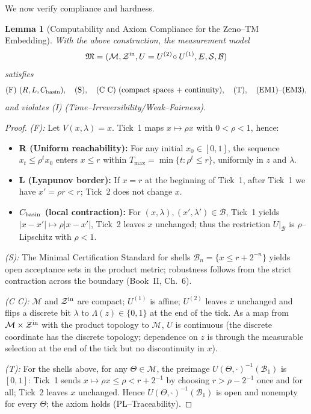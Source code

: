 \documentclass[12pt]{article}
\theoremstyle{definition}
\theoremstyle{plain}
\newtheorem{lemma}{Lemma}[section]
\begin{document}
\medskip
We now verify compliance and hardness.

\begin{lemma}[Computability and Axiom Compliance for the Zeno–TM Embedding]
\label{lem:zeno‐computability}
With the above construction, the measurement model 
\[
\mathfrak M=(\mathcal M,\mathcal Z^{\rm in},U=U^{(2)}\!\circ U^{(1)},E,\mathcal S,\mathcal B)
\]
satisfies
\[
\textup{(F)}\ (\textup{$R,L,C_{\rm basin}$}),\quad
\textup{(S)},\quad
\textup{(C C)}\ (\text{compact spaces + continuity}),\quad
\textup{(T)},\quad
\textup{(EM1)--(EM3)},
\]
and \emph{violates} \textup{(I)} (Time–Irreversibility/Weak–Fairness).
\end{lemma}

\begin{proof}
\emph{(F):} Let $V(x,\lambda)=x$. 
Tick~1 maps $x\mapsto \rho x$ with $0<\rho<1$, hence:
\begin{itemize}
  \item \textbf{R (Uniform reachability):} For any initial $x_0\in[0,1]$, the sequence $x_t\le\rho^t x_0$ enters $x\le r$ within
  \(
  T_{\max}
  = \min\{t: \rho^t \le r\}
  \),
  uniformly in $z$ and $\lambda$.
  \item \textbf{L (Lyapunov border):} If $x=r$ at the beginning of Tick~1, after Tick~1 we have $x'=\rho r<r$; Tick~2 does not change $x$.
  \item \textbf{$C_{\rm basin}$ (local contraction):} For $(x,\lambda),(x',\lambda')\in \mathcal B$,
  Tick~1 yields $|x-x'|\mapsto \rho |x-x'|$, Tick~2 leaves $x$ unchanged; thus the restriction $U|_{\mathcal B}$ is $\rho$–Lipschitz with $\rho<1$.
\end{itemize}

\emph{(S):} The Minimal Certification Standard for shells $\mathcal B_n=\{x\le r+2^{-n}\}$ yields open acceptance sets in the product metric; robustness follows from the strict contraction across the boundary (Book~II, Ch.~6).

\emph{(C C):} $\mathcal M$ and $\mathcal Z^{\rm in}$ are compact; $U^{(1)}$ is affine; $U^{(2)}$ leaves $x$ unchanged and flips a discrete bit $\lambda$ to $\Lambda(z)\in\{0,1\}$ at the end of the tick. As a map from $\mathcal M\times\mathcal Z^{\rm in}$ with the product topology to $\mathcal M$, $U$ is continuous (the discrete coordinate has the discrete topology; dependence on $z$ is through the measurable selection at the end of the tick but no discontinuity in $x$).

\emph{(T):} For the shells above, for any $\Theta\in\mathcal M$, the preimage $U(\Theta,\cdot)^{-1}(\mathcal B_1)$ is $[0,1]$:
Tick~1 sends $x\mapsto \rho x\le \rho<r+2^{-1}$ by choosing $r> \rho - 2^{-1}$ once and for all; Tick~2 leaves $x$ unchanged. Hence $U(\Theta,\cdot)^{-1}(\mathcal B_1)$ is open and nonempty for every $\Theta$; the axiom holds (PL–Traceability).


\end{proof}
\end{document}
